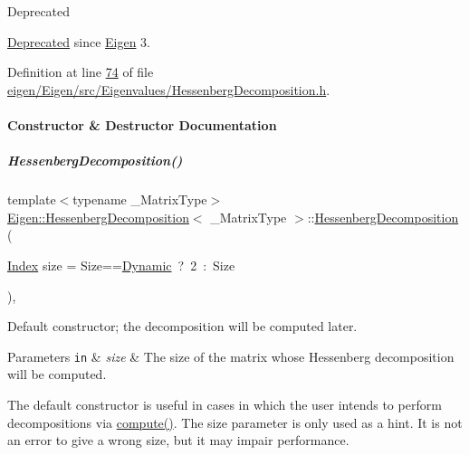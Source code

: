 \begin{DoxyRefDesc}{Deprecated}
\item[\hyperlink{deprecated__deprecated000020}{Deprecated}]since \hyperlink{namespace_eigen}{Eigen} 3. \end{DoxyRefDesc}


Definition at line \hyperlink{eigen_2_eigen_2src_2_eigenvalues_2_hessenberg_decomposition_8h_source_l00074}{74} of file \hyperlink{eigen_2_eigen_2src_2_eigenvalues_2_hessenberg_decomposition_8h_source}{eigen/\+Eigen/src/\+Eigenvalues/\+Hessenberg\+Decomposition.\+h}.



\paragraph{Constructor \& Destructor Documentation}
\mbox{\label{group___eigenvalues___module_aee1724cb6418ede1a8b9045036a5a319}} 
\subparagraph{\texorpdfstring{Hessenberg\+Decomposition()}{HessenbergDecomposition()}\hspace{0.1cm}{\footnotesize\ttfamily [1/4]}}
{\footnotesize\ttfamily template$<$typename \+\_\+\+Matrix\+Type$>$ \\
\hyperlink{group___eigenvalues___module_class_eigen_1_1_hessenberg_decomposition}{Eigen\+::\+Hessenberg\+Decomposition}$<$ \+\_\+\+Matrix\+Type $>$\+::\hyperlink{group___eigenvalues___module_class_eigen_1_1_hessenberg_decomposition}{Hessenberg\+Decomposition} (\begin{DoxyParamCaption}\item[{\hyperlink{group___eigenvalues___module_a8e287ac222f53e2c8ce82faa43e95ac6}{Index}}]{size = {\ttfamily Size==\hyperlink{namespace_eigen_ad81fa7195215a0ce30017dfac309f0b2}{Dynamic}~?~2~\+:~Size} }\end{DoxyParamCaption})\hspace{0.3cm}{\ttfamily [inline]}, {\ttfamily [explicit]}}



Default constructor; the decomposition will be computed later. 


\begin{DoxyParams}[1]{Parameters}
\mbox{\tt in}  & {\em size} & The size of the matrix whose Hessenberg decomposition will be computed.\\
\hline
\end{DoxyParams}
The default constructor is useful in cases in which the user intends to perform decompositions via \hyperlink{group___eigenvalues___module_a239a6fd42c57aab3c0b048c47fde3004}{compute()}. The {\ttfamily size} parameter is only used as a hint. It is not an error to give a wrong {\ttfamily size}, but it may impair performance.

